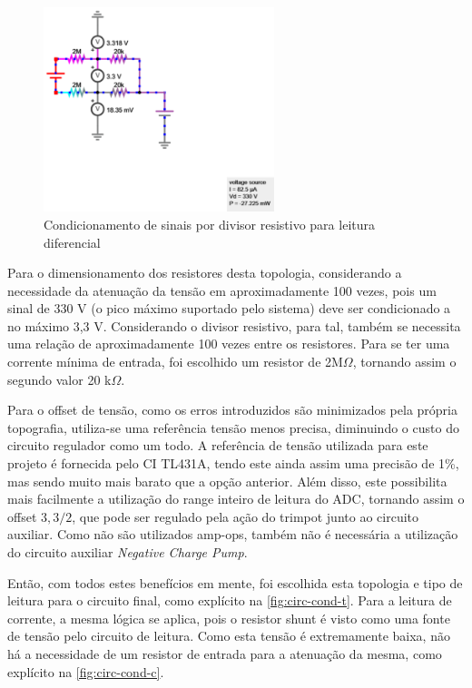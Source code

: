 \begin{figure}[htb!]
    \caption{Condicionamento de sinais por divisor resistivo para leitura diferencial}
    \label{fig:difread}
    \includegraphics[width=0.6\textwidth]{figuras/difread.png}
    \fonte{}
\end{figure}

Para o dimensionamento dos resistores desta topologia, considerando a necessidade da atenuação da tensão em aproximadamente 100 vezes, pois um sinal de 330 V (o pico máximo suportado pelo sistema) deve ser condicionado a no máximo 3,3 V. Considerando o divisor resistivo, para tal, também se necessita uma relação de aproximadamente 100 vezes entre os resistores. Para se ter uma corrente mínima de entrada, foi escolhido um resistor de 2M$\Omega$, tornando assim o segundo valor 20 k$\Omega$.

Para o offset de tensão, como os erros introduzidos são minimizados pela própria topografia, utiliza-se uma referência tensão menos precisa, diminuindo o custo do circuito regulador como um todo. A referência de tensão utilizada para este projeto é fornecida pelo \gls{CI} TL431A, tendo este ainda assim uma precisão de 1\%, mas sendo muito mais barato que a opção anterior. Além disso, este possibilita mais facilmente a utilização do range inteiro de leitura do \gls{ADC}, tornando assim o offset $3,3/2$, que pode ser regulado pela ação do trimpot junto ao circuito auxiliar. Como não são utilizados \gls{amp-op}s, também não é necessária a utilização do circuito auxiliar \textit{Negative Charge Pump}.

Então, com todos estes benefícios em mente, foi escolhida esta topologia e tipo de leitura para o circuito final, como explícito na \autoref{fig:circ-cond-t}. Para a leitura de corrente, a mesma lógica se aplica, pois o resistor shunt é visto como uma fonte de tensão pelo circuito de leitura. Como esta tensão é extremamente baixa, não há a necessidade de um resistor de entrada para a atenuação da mesma, como explícito na \autoref{fig:circ-cond-c}.

